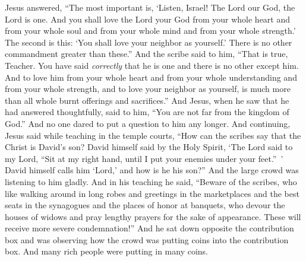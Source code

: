 \begin{biblechapter}
\verse Jesus answered, “The most important is, ‘Listen, Israel! The Lord our God, the Lord is one.
\verse And you shall love the Lord your God from your whole heart and from your whole soul and from your whole mind and from your whole strength.’
\verse The second is this: ‘You shall love your neighbor as yourself.’ There is no other commandment greater than these.”
\verse And the scribe said to him, “That is true, Teacher. You have said \textit{correctly} that he is one and there is no other except him.
\verse And to love him from your whole heart and from your whole understanding and from your whole strength, and to love your neighbor as yourself, is much more than all whole burnt offerings and sacrifices.”
\verse And Jesus, when he saw that he had answered thoughtfully, said to him, “You are not far from the kingdom of God.” And no one dared to put a question to him any longer.
 And continuing, Jesus said while teaching in the temple courts, “How can the scribes say that the Christ is David’s son?
\verse David himself said by the Holy Spirit, ‘The Lord said to my Lord, 
“Sit at my right hand, 
until I put your enemies 
under your feet.” ’
\verse David himself calls him ‘Lord,’ and how is he his son?” And the large crowd was listening to him gladly.
 And in his teaching he said, “Beware of the scribes, who like walking around in long robes and greetings in the marketplaces
\verse and the best seats in the synagogues and the places of honor at banquets,
\verse who devour the houses of widows and pray lengthy prayers for the sake of appearance. These will receive more severe condemnation!”
 And he sat down opposite the contribution box and was observing how the crowd was putting coins into the contribution box. And many rich people were putting in many coins.

\end{biblechapter}
